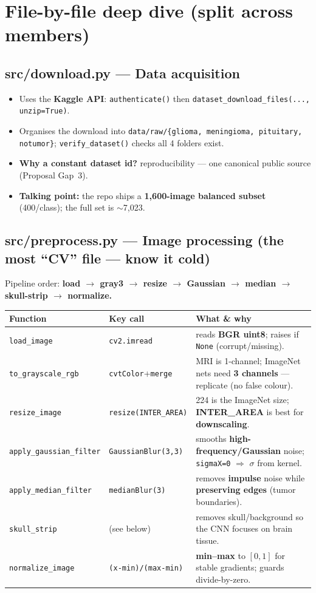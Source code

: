 \documentclass[11pt,a4paper]{article}
\newcommand{\code}[1]{\colorbox{codebg}{\small\texttt{#1}}}
\begin{document}
\section{File-by-file deep dive (split across members)}

\subsection{src/download.py --- Data acquisition}
\begin{itemize}[leftmargin=*,itemsep=1pt]
  \item Uses the \textbf{Kaggle API}: \texttt{authenticate()} then \texttt{dataset\_download\_files(..., unzip=True)}.
  \item Organises the download into \texttt{data/raw/\{glioma, meningioma, pituitary, notumor\}}; \texttt{verify\_dataset()} checks all 4 folders exist.
  \item \textbf{Why a constant dataset id?} reproducibility --- one canonical public source (Proposal Gap~3).
  \item \textbf{Talking point:} the repo ships a \textbf{1{,}600-image balanced subset} (400/class); the full set is $\sim$7{,}023.
\end{itemize}

\subsection{src/preprocess.py --- Image processing (the most ``CV'' file --- know it cold)}
Pipeline order: \textbf{load $\to$ gray3 $\to$ resize $\to$ Gaussian $\to$ median $\to$ skull-strip $\to$ normalize.}

\begin{center}
\begin{tabularx}{\textwidth}{@{}l l X@{}}
\toprule
\textbf{Function} & \textbf{Key call} & \textbf{What \& why} \\
\midrule
\code{load\_image} & \code{cv2.imread} & reads \textbf{BGR uint8}; raises if \code{None} (corrupt/missing). \\
\code{to\_grayscale\_rgb} & \code{cvtColor}+\code{merge} & MRI is 1-channel; ImageNet nets need \textbf{3 channels} --- replicate (no false colour). \\
\code{resize\_image} & \code{resize(INTER\_AREA)} & 224 is the ImageNet size; \textbf{INTER\_AREA} is best for \textbf{downscaling}. \\
\code{apply\_gaussian\_filter} & \code{GaussianBlur(3,3)} & smooths \textbf{high-frequency/Gaussian} noise; \code{sigmaX=0} $\Rightarrow$ $\sigma$ from kernel. \\
\code{apply\_median\_filter} & \code{medianBlur(3)} & removes \textbf{impulse} noise while \textbf{preserving edges} (tumor boundaries). \\
\code{skull\_strip} & (see below) & removes skull/background so the CNN focuses on brain tissue. \\
\code{normalize\_image} & \code{(x-min)/(max-min)} & \textbf{min--max} to $[0,1]$ for stable gradients; guards divide-by-zero. \\
\bottomrule
\end{tabularx}
\end{center}
\end{document}
